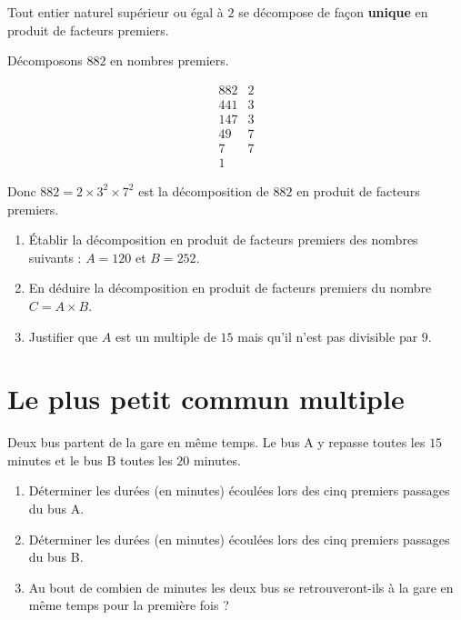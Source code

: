 \documentclass[10pt, a4paper]{article}
\begin{document}
\begin{Theoreme}

Tout entier naturel supérieur ou égal à $2$ se décompose de façon \textbf{unique} en produit
de facteurs premiers.
\end{Theoreme}

\begin{Exemple}[][5 min]
Décomposons $882$ en nombres premiers.

$$
\begin{array}{r|l}
882 & 2 \\
441 & 3 \\
147 & 3 \\
49 & 7 \\
7 & 7 \\
1 &
\end{array}
$$

Donc $882 = 2 \times 3^2 \times 7^2$ est la décomposition de $882$ en produit de facteurs premiers.
\end{Exemple}

\begin{Application}[][20 min]
\begin{enumerate}[leftmargin=*,itemsep=0.5pt]
    \item Établir la décomposition en produit de facteurs premiers des nombres suivants : $A = 120$ et $B = 252$.

    \item En déduire la décomposition en produit de facteurs premiers du nombre $C = A \times B$.

    \item Justifier que $A$ est un multiple de $15$ mais qu'il n'est pas divisible par $9$.
\end{enumerate}
\end{Application}



\section{Le plus petit commun multiple }


\begin{Activite}[][10 min]
Deux bus partent de la gare en même temps.
Le bus A y repasse toutes les $15$ minutes et le bus B toutes les $20$ minutes.

\begin{enumerate}[leftmargin=*,itemsep=0.5pt]
    \item Déterminer les durées (en minutes) écoulées lors des cinq premiers passages du bus A.
    \item Déterminer les durées (en minutes) écoulées lors des cinq premiers passages du bus B.
    \item Au bout de combien de minutes les deux bus se retrouveront-ils à la gare en même temps pour la première fois ?
\end{enumerate}
\end{Activite}
\end{document}
